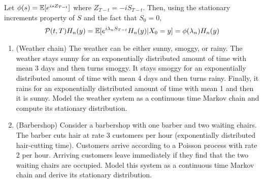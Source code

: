 \begin{solution}[Solution]
    Let \( \phi(s) = \mathbb{E}[e^{isZ_{T-t}}] \) where \( Z_{T-t} = -i S_{T-t} \). Then, using the stationary increments property of \( S \) and the fact that \( S_0 = 0 \),
    \begin{align*}
        \mathcal{P}(t,T)H_n(y) = \mathbb{E}[e^{i \lambda_n S_{T-t}} H_n(y) | X_0 = y] = \phi(\lambda_n) H_n(y)
    \end{align*}

    
    



\end{solution}


\begin{problem}
\begin{enumerate}[nolistsep,label=(\alph*)]
    \item (Weather chain) The weather can be either sunny, smoggy, or rainy. The weather stays sunny for an exponentially distributed amount of time with mean 3 days and then turns smoggy. It stays smoggy for an exponentially distributed amount of time with mean 4 days and then turns rainy. Finally, it rains for an exponentially distributed amount of time with mean 1 and then it is sunny. Model the weather system as a continuous time Markov chain and compute its stationary distribution.
    \item (Barbershop) Consider a barbershop with one barber and two waiting chairs. The barber cuts hair at rate 3 customers per hour (exponentially distributed hair-cutting time). Customers arrive according to a Poisson process with rate 2 per hour. Arriving customers leave immediately if they find that the two waiting chairs are occupied. Model this system as a continuous time Markov chain and derive its stationary distribution.
\end{enumerate}
\end{problem}


